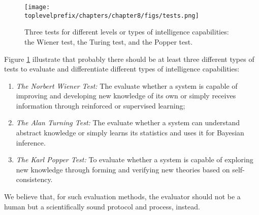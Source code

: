 \documentclass[\toplevelprefix/book-main.tex]{subfiles}
\begin{document}
\begin{figure}[t]
    \centering
    \texttt{[image: \\toplevelprefix/chapters/chapter8/figs/tests.png]}
    \caption{Three tests for different levels or types of intelligence capabilities: the Wiener test, the Turing test, and the Popper test.}
    \label{fig:three-tests}
\end{figure}

Figure \ref{fig:three-tests} illustrate that probably there should be at least three different types of tests to evaluate and differentiate different types of intelligence capabilities:
\begin{enumerate}
    \item {\em The Norbert Wiener Test:} The evaluate whether a system is capable of improving and developing new knowledge of its own or simply receives information through reinforced or supervised learning;
    \item {\em The Alan Turning Test:} The evaluate whether a system can understand abstract knowledge or simply learns its statistics and uses it for Bayesian inference.
    \item {\em The Karl Popper Test:} To evaluate whether a system is capable of exploring new knowledge through forming and verifying new theories based on self-consistency.
\end{enumerate}
We believe that, for such evaluation methods, the evaluator should not be a human but a scientifically sound protocol and process, instead.
\end{document}
